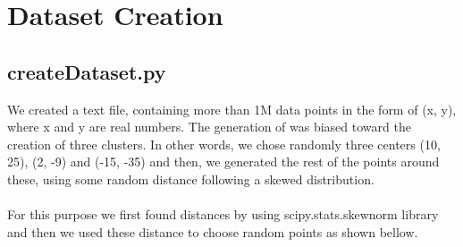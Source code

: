 
\chapter{Dataset Creation} %

\label{Chapter2} %


\section{createDataset.py}

We created a text file, containing more than 1M data points in the form of (x, y), where x and y are real numbers. The generation of was biased toward the creation of three clusters. In other words, we chose randomly three centers (10, 25), (2, -9) and (-15, -35) and then, we generated the rest of the points around these, using some random distance following a skewed distribution.\\ \\
For this purpose we first found distances by using scipy.stats.skewnorm library and then we used these distance to choose random points as shown bellow.

